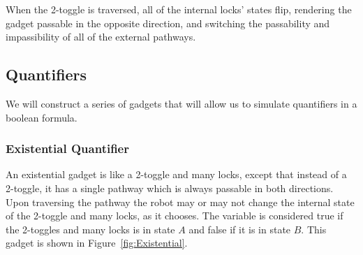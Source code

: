 
When the 2-toggle is traversed, all of the internal locks' states flip, rendering the gadget passable in the opposite direction, and switching the passability and impassibility of all of the external pathways.

\subsection{Quantifiers}

We will construct a series of gadgets that will allow us to simulate quantifiers in a boolean formula.

\subsubsection{Existential Quantifier}
An existential gadget is like a 2-toggle and many locks, except that instead of a
2-toggle, it has a single pathway which is always passable in both directions. Upon traversing the pathway
the robot may or may not change the internal state of the 2-toggle and many locks, as it chooses. The variable is 
considered true if the 2-toggles and many locks is in state $A$ and false if it is in state $B$. This gadget
is shown in Figure~\ref{fig:Existential}.

